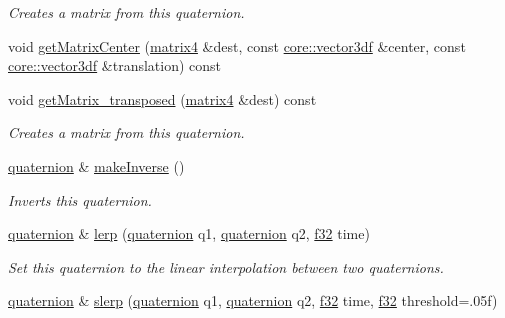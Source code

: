 \begin{DoxyCompactItemize}
\begin{DoxyCompactList}\small\item\em Creates a matrix from this quaternion. \end{DoxyCompactList}\item 
void \hyperlink{classirr_1_1core_1_1quaternion_ab0ed43e2e137b42128a80f71f03dac44}{get\+Matrix\+Center} (\hyperlink{namespaceirr_1_1core_a4c9d4e29899535971052810954a14431}{matrix4} \&dest, const \hyperlink{namespaceirr_1_1core_ae6e2b2a6c552833ebbd5b7463d03586b}{core\+::vector3df} \&center, const \hyperlink{namespaceirr_1_1core_ae6e2b2a6c552833ebbd5b7463d03586b}{core\+::vector3df} \&translation) const
\item 
\mbox{\label{classirr_1_1core_1_1quaternion_abb660c84e6f51d7c5415c4eaf28a7bd2}} 
void \hyperlink{classirr_1_1core_1_1quaternion_abb660c84e6f51d7c5415c4eaf28a7bd2}{get\+Matrix\+\_\+transposed} (\hyperlink{namespaceirr_1_1core_a4c9d4e29899535971052810954a14431}{matrix4} \&dest) const
\begin{DoxyCompactList}\small\item\em Creates a matrix from this quaternion. \end{DoxyCompactList}\item 
\mbox{\label{classirr_1_1core_1_1quaternion_a2e286be8b088fa3ade0ab74880ea4508}} 
\hyperlink{classirr_1_1core_1_1quaternion}{quaternion} \& \hyperlink{classirr_1_1core_1_1quaternion_a2e286be8b088fa3ade0ab74880ea4508}{make\+Inverse} ()
\begin{DoxyCompactList}\small\item\em Inverts this quaternion. \end{DoxyCompactList}\item 
\hyperlink{classirr_1_1core_1_1quaternion}{quaternion} \& \hyperlink{classirr_1_1core_1_1quaternion_a75b5cb2d26397f07399e79ea20f1aff1}{lerp} (\hyperlink{classirr_1_1core_1_1quaternion}{quaternion} q1, \hyperlink{classirr_1_1core_1_1quaternion}{quaternion} q2, \hyperlink{namespaceirr_a0277be98d67dc26ff93b1a6a1d086b07}{f32} time)
\begin{DoxyCompactList}\small\item\em Set this quaternion to the linear interpolation between two quaternions. \end{DoxyCompactList}\item 
\hyperlink{classirr_1_1core_1_1quaternion}{quaternion} \& \hyperlink{classirr_1_1core_1_1quaternion_a91335e9fdb50c3cfc2042aa9a4bfdf68}{slerp} (\hyperlink{classirr_1_1core_1_1quaternion}{quaternion} q1, \hyperlink{classirr_1_1core_1_1quaternion}{quaternion} q2, \hyperlink{namespaceirr_a0277be98d67dc26ff93b1a6a1d086b07}{f32} time, \hyperlink{namespaceirr_a0277be98d67dc26ff93b1a6a1d086b07}{f32} threshold=.\+05f)

\end{DoxyCompactItemize}
